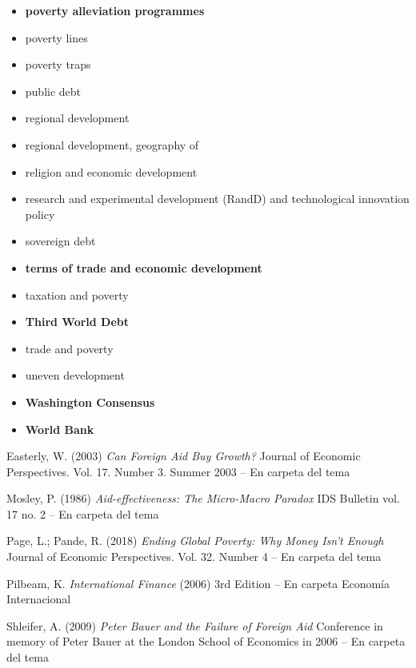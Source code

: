 \documentclass{nuevotema}
\begin{document}
\begin{itemize}
	\item \textbf{poverty alleviation programmes}
	\item poverty lines
	\item poverty traps
	\item public debt
	\item regional development
	\item regional development, geography of
	\item religion and economic development
	\item research and experimental development (RandD) and technological innovation policy
	\item sovereign debt
	\item \textbf{terms of trade and economic development}
	\item taxation and poverty
	\item \textbf{Third World Debt}
	\item trade and poverty
	\item uneven development
	\item \textbf{Washington Consensus}
	\item \textbf{World Bank}
\end{itemize}


Easterly, W. (2003) \textit{Can Foreign Aid Buy Growth?} Journal of Economic Perspectives. Vol. 17. Number 3. Summer 2003 -- En carpeta del tema

Mosley, P. (1986) \textit{Aid-effectiveness: The Micro-Macro Paradox} IDS Bulletin vol. 17 no. 2 -- En carpeta del tema

Page, L.; Pande, R. (2018) \textit{Ending Global Poverty: Why Money Isn't Enough} Journal of Economic Perspectives. Vol. 32. Number 4 -- En carpeta del tema

Pilbeam, K. \textit{International Finance} (2006) 3rd Edition -- En carpeta Economía Internacional

Shleifer, A. (2009) \textit{Peter Bauer and the Failure of Foreign Aid} Conference in memory of Peter Bauer at the London School of Economics in 2006 -- En carpeta del tema
\end{document}
